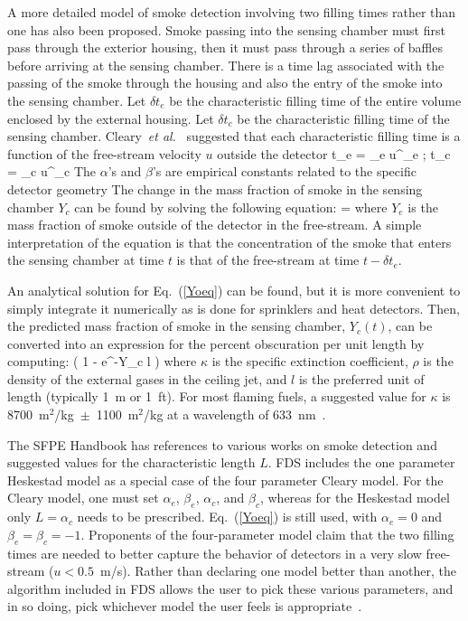 \documentclass[11pt]{book}
\begin{document}
A more detailed model of smoke detection involving two filling times rather than one has also been proposed.
Smoke passing into the sensing chamber must first pass through the exterior housing, then it must pass through a series
of baffles before arriving at the sensing chamber. There is a time lag
associated with the passing of the smoke through the housing and also the entry of the smoke into the sensing chamber.
Let $\delta t_e$ be the characteristic filling time of the entire volume enclosed by the external housing. Let
$\delta t_c$ be the characteristic filling time of the sensing chamber.
Cleary~{\em et al.}~\cite{Cleary:IAFSS6} suggested that each characteristic filling time is a function of the
free-stream velocity $u$ outside the detector
\be
\delta t_e = \alpha_e u^{\beta_e} \quad ; \quad \delta t_c = \alpha_c u^{\beta_c}
\ee
The $\alpha$'s and $\beta$'s are empirical constants related to the specific detector geometry
The change in the mass fraction of smoke in the sensing chamber $Y_c$ can be found by solving the following equation:
\be
{} =  \label{Yoeq}
\ee
where $Y_e$ is the mass fraction of smoke outside of the detector in the free-stream.
A simple interpretation of the equation is that the concentration of the smoke that enters the sensing chamber at time $t$
is that of the free-stream at time $t-\delta t_e$.

An analytical solution for Eq.~(\ref{Yoeq}) can be found, but it is more convenient to simply integrate it numerically
as is done for sprinklers and heat detectors. Then, the predicted mass fraction of smoke in the sensing chamber,
$Y_c(t)$, can be converted into an expression for the percent obscuration per unit length by computing:
\be
\left( 1 - e^{-\kappa \rho Y_c l} \right) 
\ee
where $\kappa$ is the specific extinction coefficient, $\rho$ is the density of the external gases in the ceiling jet,
and $l$ is the preferred unit of length (typically 1~m or 1~ft).
For most flaming fuels, a suggested value for $\kappa$ is 8700~m$^2$/kg~$\pm$~1100~m$^2$/kg at a
wavelength of 633~nm~\cite{Mulholland:F+M}.

The SFPE Handbook has references to various works on smoke detection and suggested values for the
characteristic length $L$. FDS includes the one parameter Heskestad model as a special case of the four parameter
Cleary model. For the Cleary model, one must set
$\alpha_e$, $\beta_e$, $\alpha_c$, and $\beta_c$, whereas for the Heskestad model only $L=\alpha_c$ needs to be
prescribed. Eq.~(\ref{Yoeq})
is still used, with $\alpha_e=0$ and $\beta_e=\beta_c=-1$.
Proponents of the four-parameter model claim that the two filling times are needed to
better capture the behavior of detectors in a very
slow free-stream ($u<0.5$~m/s). Rather than declaring one model better than another,
the algorithm included in FDS allows the
user to pick these various parameters, and in so doing, pick whichever model the user feels is appropriate~\cite{CSE_GCR}.
\end{document}
